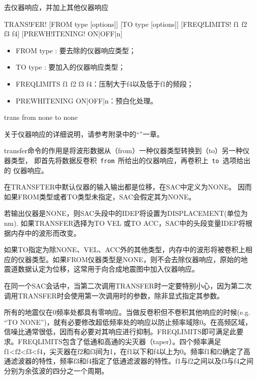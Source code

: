 \label{cmd:transfer}

去仪器响应，并加上其他仪器响应

\begin{SACSTX}
TRANS!FER! [FROM type [options]] [TO type [options]]
    [FREQ!LIMITS! f1 f2 f3 f4] [PREWH!ITENING! ON|OFF|n]
\end{SACSTX}

\begin{itemize}
\item FROM type : 要去除的仪器响应类型；
\item TO type : 要加入的仪器响应类型；
\item FREQLIMITS f1 f2 f3 f4：压制大于f4以及低于f1的频段；
\item PREWHITENING ON|OFF|n：预白化处理。
\end{itemize}

\begin{SACDFT}
trans from none to none
\end{SACDFT}

关于仪器响应的详细说明，请参考附录中的``''一章。

transfer命令的作用是将波形数据从（from）一种仪器类型转换到（to）另一种仪器类型，
即首先将数据反卷积~\verb+from+~所给出的仪器响应，再卷积上~\verb+to+~选项给出的
仪器响应。

在TRANSFTER中默认仪器的输入输出都是位移，在SAC中定义为NONE。
因而如果FROM类型或者TO类型未指定，SAC会假定其为NONE。

若输出仪器是NONE，则SAC头段中的IDEP将设置为DISPLACEMENT(单位为nm). 如果TRANSFER选择为TO VEL
或TO ACC，SAC中的头段变量IDEP将根据内存中的波形而改变。

如果TO指定为除NONE、VEL、ACC外的其他类型，内存中的波形将被卷积上相应的仪器类型。如果FROM仪器类型是NONE，则不会去除仪器响应，原始的地震道数据认定为位移，这常用于向合成地震图中加入仪器响应。

在同一个SAC会话中，当第二次调用TRANSFER时一定要特别小心，因为第二次调用TRANSFER时会使用第一次调用时的参数，除非显式指定其参数。

所有的地震仪在0频率处都具有零响应。当做反卷积但不卷积其他响应的时候(e.g. ``TO NONE'')，就有必要修改超低频率处的响应以防止频率域除0。在高频区域，信噪比通常很低，因而有必要对其响应进行抑制。FREQLIMITS即可满足此要求。FREQLIMITS包含了低通和高通的尖灭器（taper）。四个频率满足f1<f2<f3<f4，尖灭器在f2和f3间为1，在f1以下和f4以上为0。频率f1和f2确定了高通滤波器的特性，频率f3和f4指定了低通滤波器的特性。f1与f2之间以及f3与f4之间分别为余弦波的四分之一个周期。

